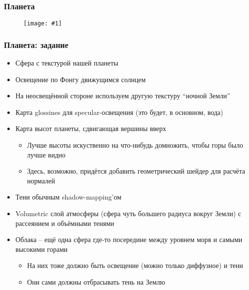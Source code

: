 \documentclass{beamer}
\newcommand{\slideimage}[1]{
  \begin{figure}
    \begin{adjustbox}{width=\textwidth, totalheight=\textheight-2\baselineskip-2\baselineskip,keepaspectratio}
      \texttt{[image: \#1]}
    \end{adjustbox}
  \end{figure}
}
\begin{document}
\begin{frame}
\frametitle{Планета}
\slideimage{planet.jpg}
\end{frame}

\begin{frame}[fragile]
\frametitle{Планета: задание}
\fontsize{8pt}{8pt}
\selectfont
\begin{itemize}
\item Сфера с текстурой нашей планеты
\item Освещение по Фонгу движущимся солнцем
\item На неосвещённой стороне используем другую текстуру ``ночной Земли''
\item Карта glossines для specular-освещения (это будет, в основном, вода)
\item Карта высот планеты, сдвигающая вершины вверх
\begin{itemize}
\fontsize{8pt}{8pt}
\selectfont
\item Лучше высоты искуственно на что-нибудь домножить, чтобы горы было лучше видно
\item Здесь, возможно, придётся добавить геометрический шейдер для расчёта нормалей
\end{itemize}
\item Тени обычным shadow-mapping'ом
\item Volumetric слой атмосферы (сфера чуть большего радиуса вокруг Земли) с рассеянием и объёмными тенями
\item Облака -- ещё одна сфера где-то посередине между уровнем моря и самыми высокими горами
\begin{itemize}
\fontsize{8pt}{8pt}
\selectfont
\item На них тоже должно быть освещение (можно только диффузное) и тени
\item Они сами должны отбрасывать тень на Землю
\end{itemize}
\end{itemize}
\end{frame}
\end{document}
